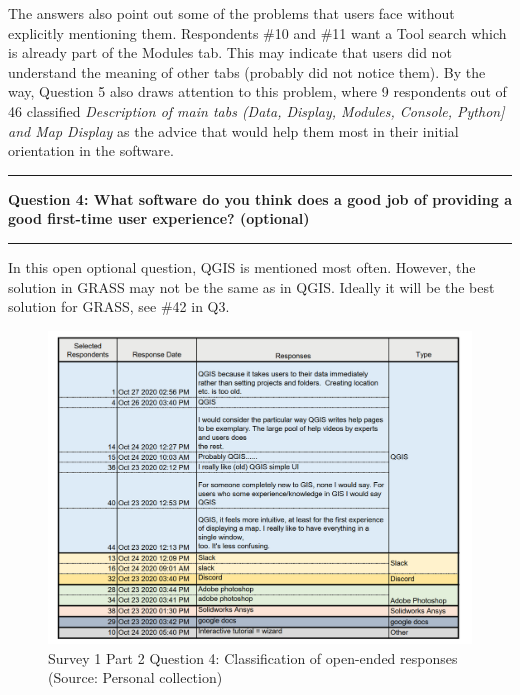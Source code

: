 \documentclass[a4paper,10pt,twoside]{article}
\begin{document}
The answers also point out some of the problems that users face without explicitly mentioning them. Respondents \#10 and \#11 want a Tool search which is already part of the Modules tab. This may indicate that users did not understand the meaning of other tabs (probably did not notice them). By the way, Question 5 also draws attention to this problem, where 9 respondents out of 46 classified \textit{Description of main tabs (Data, Display, Modules, Console, Python] and Map Display} as the advice that would help them most in their initial orientation in the software.

\par\noindent\rule{\textwidth}{0.4pt}
\noindent \textbf{Question 4: What software do you think does a good job of providing a good first-time user experience? (optional)}
\par\noindent\rule{\textwidth}{0.4pt}
\noindent In this open optional question, QGIS is mentioned most often. However, the solution in GRASS may not be the same as in QGIS. Ideally it will be the best solution for GRASS, see \#42 in Q3.

\vspace{0.3cm}
\begin{figure}[hbt!] 
\begin{center}
\includegraphics[width=16cm]{../surveys/analyzed_data/survey1_part2_question4_open_ended_1.png} 
\caption[Survey 1 Part 2 Question 4: Classification of open-ended responses]{Survey 1 Part 2 Question 4: Classification of open-ended responses (Source: Personal collection)}
\label{fig:survey1_part2_question4_open_ended_1}
\end{center}
\end{figure}
\end{document}
